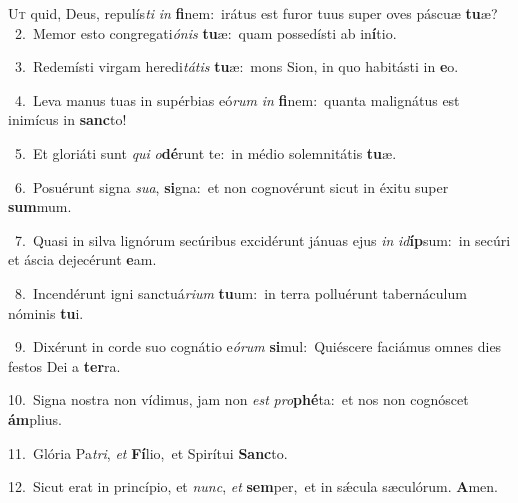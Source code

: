\lettrine{\initial\textcolor{\initialcolor}{U}}{t} quid, Deus, repulís\textit{ti} \textit{in} \textbf{fi}\-nem:~\star irátus est furor tuus super oves páscuæ \textbf{tu}\-æ?\\
{\numbfont\textcolor{\numbcolor}{~2.}}~Memor esto congregati\-\textit{ó}\-\textit{nis} \textbf{tu}\-æ:~\star quam possedísti ab in\-\textbf{í}\-tio.\par
{\numbfont\textcolor{\numbcolor}{~3.}}~Redemísti virgam heredi\-\textit{tá}\-\textit{tis} \textbf{tu}\-æ:~\star mons Sion, in quo habitásti in \textbf{e}\-o.\par
{\numbfont\textcolor{\numbcolor}{~4.}}~Leva manus tuas in supérbias eó\textit{rum} \textit{in} \textbf{fi}\-nem:~\star quanta malignátus est inimícus in \textbf{sanc}\-to!\par
{\numbfont\textcolor{\numbcolor}{~5.}}~Et gloriáti sunt \textit{qui} \textit{o}\-\textbf{dé}runt te:~\star in médio solemnitátis \textbf{tu}\-æ.\par
{\numbfont\textcolor{\numbcolor}{~6.}}~Posuérunt signa \textit{su}\-\textit{a}, \textbf{si}\-gna:~\star et non cognovérunt sicut in éxitu super \textbf{sum}\-mum.\par
{\numbfont\textcolor{\numbcolor}{~7.}}~Quasi in silva lignórum secúribus excidérunt jánuas ejus \textit{in} \textit{id}\-\textbf{íp}sum:~\star in secúri et áscia dejecérunt \textbf{e}\-am.\par
{\numbfont\textcolor{\numbcolor}{~8.}}~Incendérunt igni sanctuá\-\textit{ri}\-\textit{um} \textbf{tu}\-um:~\star in terra polluérunt tabernáculum nóminis \textbf{tu}\-i.\par
{\numbfont\textcolor{\numbcolor}{~9.}}~Dixérunt in corde suo cognátio e\-\textit{ó}\-\textit{rum} \textbf{si}\-mul:~\star Quiéscere faciámus omnes dies festos Dei a \textbf{ter}\-ra.\par
{\numbfont\textcolor{\numbcolor}{10.}}~Signa nostra non vídimus, jam non \textit{est} \textit{pro}\-\textbf{phé}ta:~\star et nos non cognóscet \textbf{ám}\-plius.\par
{\numbfont\textcolor{\numbcolor}{11.}}~Glória Pa\-\textit{tri}\-, \textit{et} \textbf{Fí}\-lio,~\star et Spirítui \textbf{Sanc}\-to.\par
{\numbfont\textcolor{\numbcolor}{12.}}~Sicut erat in princípio, et \textit{nunc}\-, \textit{et} \textbf{sem}\-per,~\star et in sǽcula sæculórum. \textbf{A}\-men.\par
